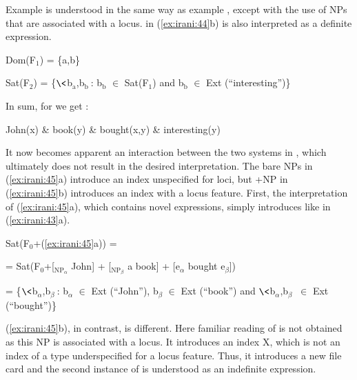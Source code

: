 \documentclass[output=paper,
modfonts
]{langscibook}
\begin{document}
Example  is understood in the same way as example , except with the use of NPs that are associated with a locus.  in (\ref{ex:irani:44}b) is also interpreted as a definite expression. 

\begin{exe}

\ex Dom(F$_1$) = \{a,b\} \par 
Sat(F$_2$) = \{$\<$b$_\text{a}$,b$_\text{b}\>$: b$_\text{b}$ \(\in\) Sat(F$_1$) and b$_\text{b}$ \(\in\) Ext (``interesting'')\} \par 

\end{exe}

In sum, for  we get :

\begin{exe}

\ex\label{ex:irani:62} John(x) \& book(y) \& bought(x,y) \& interesting(y)

\end{exe}

It now becomes apparent an interaction between the two systems in , which ultimately does not result in the desired interpretation. The bare NPs in (\ref{ex:irani:45}a) introduce an index unspecified for loci, but +NP in (\ref{ex:irani:45}b) introduces an index with a locus feature. First, the interpretation of (\ref{ex:irani:45}a), which contains novel expressions, simply introduces  like in (\ref{ex:irani:43}a). 

\begin{exe}

\ex Sat(F$_0$+(\ref{ex:irani:45}a)) = \par 
= Sat(F$_0$+[$_{\text{NP}_{\alpha}}$ John] + [$_{\text{NP}_\beta}$ a book] + [e$_{\alpha}$ bought e$_{\beta}$])\par 
= \{$\<$b$_{\alpha}$,b$_{\beta}\>$: b$_{\alpha}$ \(\in\) Ext (``John''), b$_{\beta}$ \(\in\) Ext (``book'') and $\<$b$_{\alpha}$,b$_{\beta}\>$ \(\in\) Ext \\ (``bought'')\}  

\end{exe}

(\ref{ex:irani:45}b), in contrast, is different. Here familiar reading of  is not obtained as this NP is associated with a locus. It introduces an index X, which is not an index of a type underspecified for a locus feature. Thus, it introduces a new file card and the second instance of  is understood as an indefinite expression. 
\end{document}
